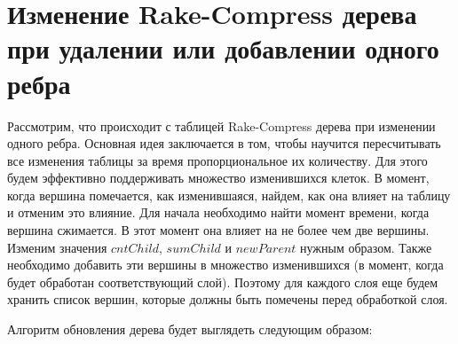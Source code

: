 \FloatBarrier
\section{Изменение Rake-Compress дерева при удалении или добавлении одного ребра}   

Рассмотрим, что происходит с таблицей Rake-Compress дерева при изменении одного ребра.
Основная идея заключается в том, чтобы научится пересчитывать все изменения таблицы за время пропорциональное их количеству.
Для этого будем эффективно поддерживать множество изменившихся клеток. 
В момент, когда вершина помечается, как изменившаяся, найдем, как она влияет на таблицу и отменим это влияние. 
Для начала необходимо найти момент времени, когда вершина сжимается. В этот момент она влияет на не более чем две вершины. 
Изменим значения $cntChild$, $sumChild$ и $newParent$ нужным образом. 
Также необходимо добавить эти вершины в множество изменившихся (в момент, когда будет обработан соответствующий слой).
Поэтому для каждого слоя еще будем хранить список вершин, которые должны быть помечены перед обработкой слоя.

Алгоритм обновления дерева будет выглядеть следующим образом:


